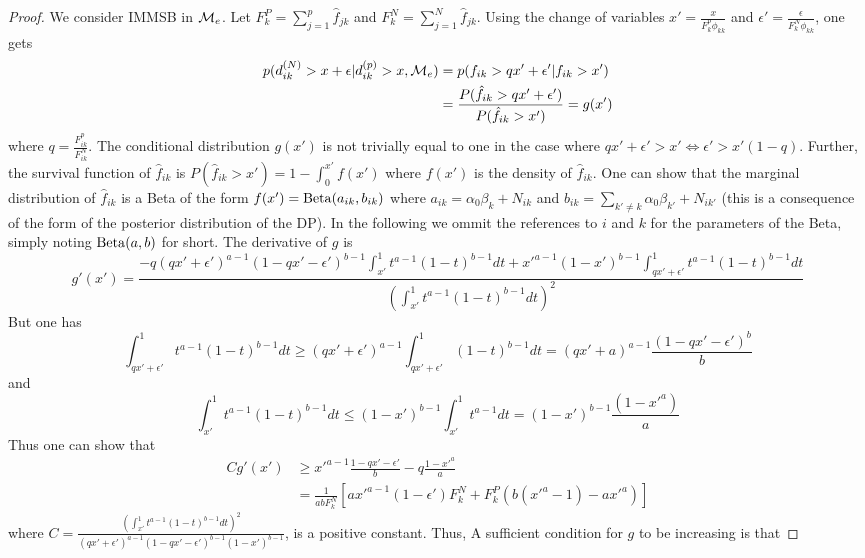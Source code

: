 \begin{proof}

We consider IMMSB in $\mathcal{M}_e$. Let $F_k^P=\sum_{j=1}^p \hat f_{jk}$ and $F_k^N=\sum_{j=1}^N \hat f_{jk}$.
Using the change of variables $x'=\frac{x}{F_k^p \phi_{kk}}$ and $\epsilon' = \frac{\epsilon}{F_k^N \phi_{kk}}$, one gets
\begin{align*}
p(d_{ik}^{(N)} > x+\epsilon | d_{ik}^{(p)} > x, \mathcal{M}_e) &= p(f_{ik} > qx'+\epsilon' | f_{ik} > x') \\
&=\frac{P(\hat f_{ik} > qx'+\epsilon')}{P(\hat f_{ik} > x')} = g(x')
\end{align*}
where $q=\frac{F_{ik}^p}{F_{ik}^N}$. The conditional distribution $g(x')$ is not trivially equal to one in the case where $qx'+\epsilon' > x' \Leftrightarrow \epsilon' > x'(1-q)$. Further, the survival function of $\hat f_{ik}$ is $P(\hat f_{ik} >x') = 1-\int_0^{x'} f(x')$ where $f(x')$ is the density of $\hat f_{ik}$. One can show that the marginal distribution of $\hat f_{ik}$ is a Beta of the form $f(x')=\mathrm{Beta}(a_{ik}, b_{ik})$  where $a_{ik} = \alpha_0\beta_k + N_{ik}$ and $b_{ik} = \sum_{k'\neq k} \alpha_0\beta_{k'} + N_{ik'}$  (this is a consequence of the form of the posterior distribution of the DP). In the following we ommit the references to $i$ and $k$ for the parameters of the Beta, simply noting $\mathrm{Beta}(a, b)$ for short. The derivative of $g$ is
\begin{equation*}
g'(x') = \frac{-q (qx'+\epsilon')^{a-1}(1-qx'-\epsilon')^{b-1}\int_{x'}^1t^{a-1} (1-t)^{b-1} dt + x'^{a-1}(1-x')^{b-1}\int_{qx'+\epsilon'}^1 t^{a-1}(1-t)^{b-1} dt}{\left(\int_{x'}^1t^{a-1}(1-t)^{b-1}dt\right)^2}
\end{equation*}
But one has
\begin{equation*}
\int_{qx'+\epsilon'}^1 t^{a-1}(1-t)^{b-1}dt \geq (qx'+\epsilon')^{a-1}\int_{qx'+\epsilon'}^1 (1-t)^{b-1}dt = (qx'+a)^{a-1}\frac{(1-qx'-\epsilon')^b}{b}
\end{equation*}
and
\begin{equation*}
\int_{x'}^1 t^{a-1}(1-t)^{b-1}dt \leq (1-x')^{b-1}\int_{x'}^1 t^{a-1}dt = (1-x')^{b-1}\frac{(1-x'^a)}{a}
\end{equation*}
Thus one can show that
\begin{align*}
Cg'(x') &\geq x'^{a-1} \frac{1-qx'-\epsilon'}{b} -q\frac{1-x'^a}{a}  \\
        &= \frac{1}{abF_k^N} \left[ ax'^{a-1}(1-\epsilon')F_k^N + F_k^P (b(x'^a-1) - ax'^a) \right]
\end{align*}
where $C=\frac{\left(\int_{x'}^1t^{a-1}(1-t)^{b-1}dt\right)^2}{(qx'+\epsilon')^{a-1}(1-qx'-\epsilon')^{b-1}(1-x')^{b-1}}$, is a positive constant. Thus, A sufficient condition for $g$ to be increasing is that

\end{proof}
